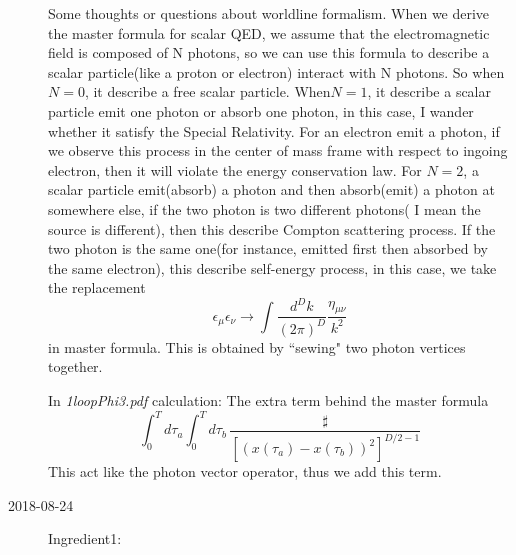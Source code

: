 \begin{description}
Some thoughts or questions about worldline formalism. When we derive the
master formula for scalar QED, we assume that the electromagnetic field
is composed of N photons, so we can use this formula to describe a scalar
particle(like a proton or electron) interact with N photons. So when
$N=0$, it describe a free scalar particle. When$N=1$, it describe a
scalar particle emit one photon or absorb one photon, in this case, I
wander whether it satisfy the Special Relativity. For an electron emit a
photon, if we observe this process in the center of mass frame with
respect to ingoing electron, then it will violate the energy conservation
law. For $N=2$, a scalar particle emit(absorb) a photon and then
absorb(emit) a photon at somewhere else, if the two photon is two
different photons( I mean the source is different), then this describe
Compton scattering process. If the two photon is the same one(for
instance, emitted first then absorbed by the same electron), this
describe self-energy process, in this case, we take the replacement
\[
\epsilon_\mu\epsilon_\nu\longrightarrow\int\frac{d^{D}k}{(2\pi)^{D}}\frac{\eta_{\mu\nu}}{k^2}
\]
in master formula. This is obtained by ``sewing" two photon vertices together.


In {\em 1loopPhi3.pdf} calculation: The extra term behind the master formula
\[
\int_0^T \! d\tau_a\int_0^T \! d\tau_b  \,\frac{\sharp}{[(x(\tau_a)-x(\tau_b))^2]^{D/2-1}}
\]
This act like the photon vector operator, thus we add this term.


\item[2018-08-24] %
Ingredient1:


\end{description}
